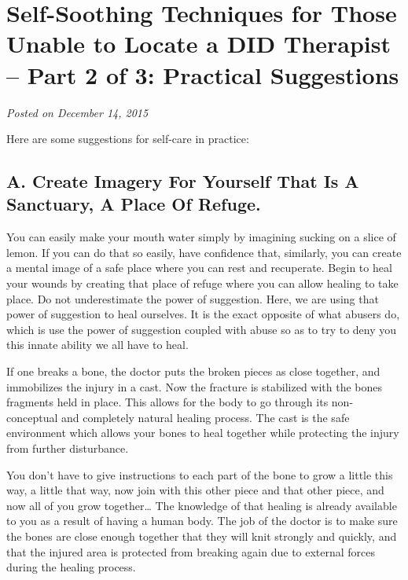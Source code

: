 \documentclass[]{book}
\begin{document}
\hypertarget{self-soothing-techniques-for-those-unable-to-locate-a-did-therapist-part-2-of-3-practical-suggestions}{%
\section{Self-Soothing Techniques for Those Unable to Locate a DID Therapist -- Part 2 of 3: Practical Suggestions}\label{self-soothing-techniques-for-those-unable-to-locate-a-did-therapist-part-2-of-3-practical-suggestions}}

\emph{Posted on December 14, 2015}

Here are some suggestions for self-care in practice:

\hypertarget{a.-create-imagery-for-yourself-that-is-a-sanctuary-a-place-of-refuge.}{%
\subsection*{A. Create Imagery For Yourself That Is A Sanctuary, A Place Of Refuge.}\label{a.-create-imagery-for-yourself-that-is-a-sanctuary-a-place-of-refuge.}}

You can easily make your mouth water simply by imagining sucking on a slice of lemon. If you can do that so easily, have confidence that, similarly, you can create a mental image of a safe place where you can rest and recuperate. Begin to heal your wounds by creating that place of refuge where you can allow healing to take place. Do not underestimate the power of suggestion. Here, we are using that power of suggestion to heal ourselves. It is the exact opposite of what abusers do, which is use the power of suggestion coupled with abuse so as to try to deny you this innate ability we all have to heal.

If one breaks a bone, the doctor puts the broken pieces as close together, and immobilizes the injury in a cast. Now the fracture is stabilized with the bones fragments held in place. This allows for the body to go through its non-conceptual and completely natural healing process. The cast is the safe environment which allows your bones to heal together while protecting the injury from further disturbance.

You don't have to give instructions to each part of the bone to grow a little this way, a little that way, now join with this other piece and that other piece, and now all of you grow together\ldots{} The knowledge of that healing is already available to you as a result of having a human body. The job of the doctor is to make sure the bones are close enough together that they will knit strongly and quickly, and that the injured area is protected from breaking again due to external forces during the healing process.
\end{document}
